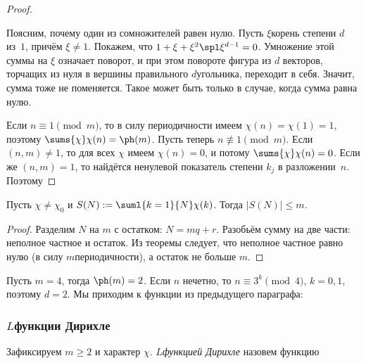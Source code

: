 \documentclass[a4paper]{article}
\def\nequiv{\not\equiv}
\begin{document}
\begin{proof}
\begin{petit}
Поясним, почему один из сомножителей равен нулю. Пусть $\xi$\т корень степени $d$ из~$1$,
причём $\xi \neq 1$. Покажем, что $1 + \xi + \xi^2\spl \xi^{d-1} = 0$. Умножение этой суммы на $\xi$ означает поворот,
и при этом повороте фигура из $d$ векторов, торчащих из нуля в вершины правильного $d$\д угольника, переходит в себя.
Значит, сумма тоже не поменяется. Такое может быть только в случае, когда сумма равна нулю.
\end{petit}

 Если $n\equiv1\pmod{m}$, то в силу периодичности имеем $\chi(n)=\chi(1)=1$, поэтому $\sums{\chi}\chi(n)=\ph(m)$. Пусть теперь
$n\nequiv1 \pmod{m}$. Если $(n,m)\neq1$, то для всех $\chi$ имеем $\chi(n)=0$, и потому $\sums{\chi}\chi(n)=0$.
Если же $(n,m)=1$, то найдётся ненулевой показатель степени $k_j$ в разложении~$n$. Поэтому
\hfill\end{proof}

\begin{imp}
Пусть $\chi\neq \chi_0$ и $S(N):=\suml{k=1}{N}\chi(k)$. Тогда $|S(N)|\le m$.
\end{imp}
\begin{proof}
Разделим $N$ на $m$ с остатком: $N = mq+r$. Разобьём сумму на две части: неполное частное и остаток.
Из теоремы следует, что неполное частное равно нулю (в силу $m$\д периодичности), а остаток не больше $m$.
\end{proof}
\begin{ex}
Пусть $m=4$, тогда $\ph(m)=2$. Если $n$ нечетно, то $n\equiv3^k\pmod{4}$, $k=0,1$, поэтому $d=2$.
Мы приходим к функции из предыдущего параграфа:
\end{ex}

\subsubsection{$L$\д функции Дирихле}

\begin{df}
Зафиксируем $m\ge2$ и характер $\chi$. \emph{$L$\д функцией Дирихле} назовем функцию
\end{df}
\end{document}
